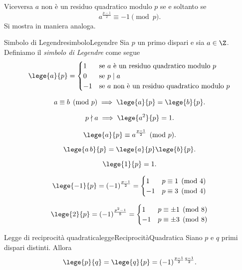 	\begin{oss}
	Viceversa \(a\) non è un residuo quadratico modulo \(p\) se e soltanto se
		\[
		a^{\frac{p-1}{2}} \equiv -1 \pmod{p}.
		\]
	Si mostra in maniera analoga.
	\end{oss}

	\begin{defn}{Simbolo di Legendre}{simboloLegendre}
	Sia \(p\) un primo dispari e sia \(a\in\Z\). Definiamo il \emph{simbolo di Legendre} come segue
		\[
		\lege{a}{p} = 	\begin{cases}
						1 & \text{se \(a\) è un residuo quadratico modulo \(p\)}\\
						0 & \text{se \(p\mid a\)}\\
						-1 & \text{se \(a\) non è un residuo quadratico modulo \(p\)}
						\end{cases}
		\]
	\end{defn}

	\begin{pr}
		\[
		a \equiv b \pmod{p} \implies \lege{a}{p} = \lege{b}{p}.
		\]
	\end{pr}

	\begin{pr}
		\[
		p \nmid a \implies \lege{a^2}{p} = 1.
		\]
	\end{pr}

	\begin{pr}
		\[
		\lege{a}{p} \equiv a^{\frac{p-1}{2}} \pmod{p}.
		\]
	\end{pr}

	\begin{pr}
		\[
		\lege{a\,b}{p} = \lege{a}{p}\lege{b}{p}.
		\]
	\end{pr}

	\begin{pr}
		\[
		\lege{1}{p} = 1.
		\]
	\end{pr}

	\begin{pr}
		\[
		\lege{-1}{p} = (-1)^{\frac{p-1}{2}} = 	\begin{cases}
												1 & p\equiv 1 \pmod{4}\\
												-1 & p\equiv 3 \pmod{4}
												\end{cases}
		\]
	\end{pr}

	\begin{pr}
		\[
		\lege{2}{p} = (-1)^{\frac{p^2-1}{8}} = 	\begin{cases}
												1 & p\equiv \pm 1 \pmod{8}\\
												-1 & p\equiv \pm 3 \pmod{8}
												\end{cases}
		\]
	\end{pr}
%
%
	\begin{teor}{Legge di reciprocità quadratica}{leggeReciprocitàQuadratica}
	Siano \(p\) e \(q\) primi dispari distinti. Allora
		\[
		\lege{p}{q} = \lege{q}{p} = (-1)^{\frac{p-1}{2}\frac{q-1}{2}}.
		\]
	\end{teor}

